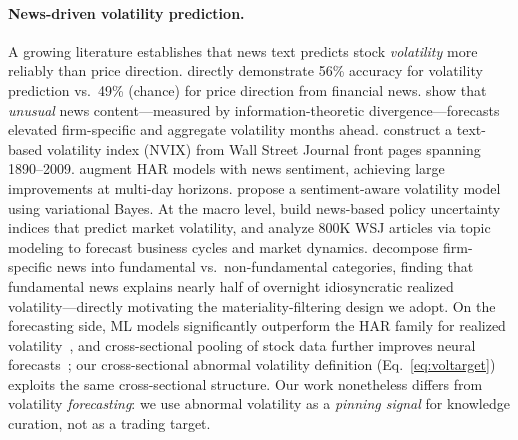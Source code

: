 \documentclass{article}
\begin{document}
\paragraph{News-driven volatility prediction.}
A growing literature establishes that news text predicts stock \emph{volatility} more reliably than price direction.
\citet{atkins2018volatility} directly demonstrate 56\% accuracy for volatility prediction vs.\ 49\% (chance) for price direction from financial news.
\citet{glasserman2019unusual} show that \emph{unusual} news content---measured by information-theoretic divergence---forecasts elevated firm-specific and aggregate volatility months ahead.
\citet{manela2017news} construct a text-based volatility index (NVIX) from Wall Street Journal front pages spanning 1890--2009.
\citet{bodilsen2025exploiting} augment HAR models with news sentiment, achieving large improvements at multi-day horizons.
\citet{xing2019sentiment} propose a sentiment-aware volatility model using variational Bayes.
At the macro level, \citet{baker2016measuring} build news-based policy uncertainty indices that predict market volatility, and \citet{bybee2024business} analyze 800K WSJ articles via topic modeling to forecast business cycles and market dynamics.
\citet{boudoukh2019firm} decompose firm-specific news into fundamental vs.\ non-fundamental categories, finding that fundamental news explains nearly half of overnight idiosyncratic realized volatility---directly motivating the materiality-filtering design we adopt.
On the forecasting side, ML models significantly outperform the HAR family for realized volatility~\citep{christensen2023ml}, and cross-sectional pooling of stock data further improves neural forecasts~\citep{zhang2024commonality}; our cross-sectional abnormal volatility definition (Eq.~\ref{eq:voltarget}) exploits the same cross-sectional structure.
Our work nonetheless differs from volatility \emph{forecasting}: we use abnormal volatility as a \emph{pinning signal} for knowledge curation, not as a trading target.
\end{document}
